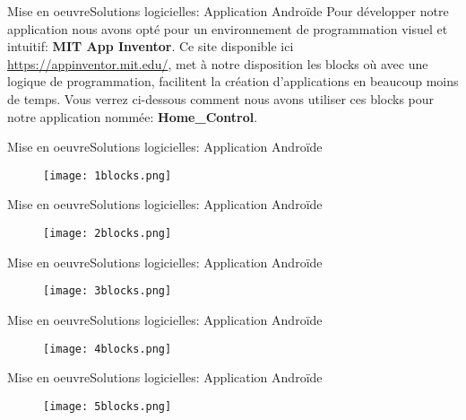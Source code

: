 \documentclass{beamer}
\begin{document}
\begin{frame}{Mise en oeuvre}{Solutions logicielles: Application Androïde}
	Pour développer notre application nous avons opté pour un environnement de programmation visuel et intuitif: \textbf{MIT App Inventor}. Ce site disponible ici \textcolor{blue}{\url{https://appinventor.mit.edu/}}, met à notre disposition les blocks où avec une logique de programmation, facilitent la création d'applications en beaucoup moins de temps. Vous verrez ci-dessous comment nous avons utiliser ces blocks pour notre application nommée: \textbf{Home\_Control}.
\end{frame}

	\begin{frame}{Mise en oeuvre}{Solutions logicielles: Application Androïde}
	\begin{figure}\centering
		\texttt{[image: 1blocks.png]}
	\end{figure}	
\end{frame}

	\begin{frame}{Mise en oeuvre}{Solutions logicielles: Application Androïde}
	\begin{figure}\centering
		\texttt{[image: 2blocks.png]}
	\end{figure}	
\end{frame}

\begin{frame}{Mise en oeuvre}{Solutions logicielles: Application Androïde}
	\begin{figure}\centering
		\texttt{[image: 3blocks.png]}
	\end{figure}	
\end{frame}

\begin{frame}{Mise en oeuvre}{Solutions logicielles: Application Androïde}
	\begin{figure}\centering
		\texttt{[image: 4blocks.png]}
	\end{figure}	
\end{frame}

\begin{frame}{Mise en oeuvre}{Solutions logicielles: Application Androïde}
	\begin{figure}\centering
		\texttt{[image: 5blocks.png]}
	\end{figure}	
\end{frame}
\end{document}
